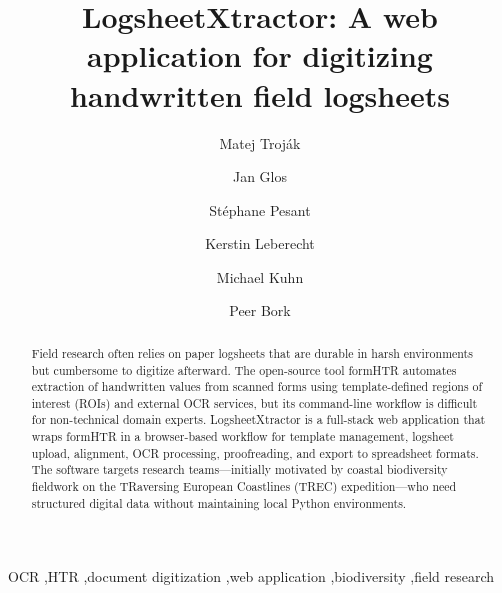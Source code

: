 \documentclass[preprint,12pt,a4paper]{elsarticle}
\begin{document}
\renewcommand{\labelenumii}{\arabic{enumi}.\arabic{enumii}}

\begin{frontmatter}

\title{LogsheetXtractor: A web application for digitizing handwritten field logsheets}

\author[embl]{Matej Troj\'{a}k}

\author[masaryk]{Jan Glos}

\author[ebi]{St\'{e}phane Pesant}

\author[embl]{Kerstin Leberecht}

\author[embl]{Michael Kuhn}

\author[embl]{Peer Bork}

\address[embl]{EMBL, Heidelberg, Germany}
\address[ebi]{EMBL-EBI, Hinxton, UK}
\address[masaryk]{Masaryk University, Czech Republic}

\begin{abstract}
Field research often relies on paper logsheets that are durable in harsh environments but cumbersome to digitize afterward.
The open-source tool formHTR automates extraction of handwritten values from scanned forms using template-defined regions of interest (ROIs) and external OCR services, but its command-line workflow is difficult for non-technical domain experts.
LogsheetXtractor is a full-stack web application that wraps formHTR in a browser-based workflow for template management, logsheet upload, alignment, OCR processing, proofreading, and export to spreadsheet formats.
The software targets research teams---initially motivated by coastal biodiversity fieldwork on the TRaversing European Coastlines (TREC) expedition---who need structured digital data without maintaining local Python environments.
\end{abstract}

\begin{keyword}
OCR \sep HTR \sep document digitization \sep web application \sep biodiversity \sep field research
\end{keyword}

\end{frontmatter}

\end{document}
